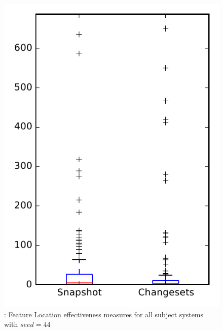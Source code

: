 
\begin{figure}
\centering
\includegraphics[height=0.4\textheight]{figures/flt_seed/rq1_overview_44}
\caption{\rone: Feature Location effectiveness measures for all subject systems with $seed=44$}
\label{fig:flt_seed:rq1:overview}
\end{figure}
